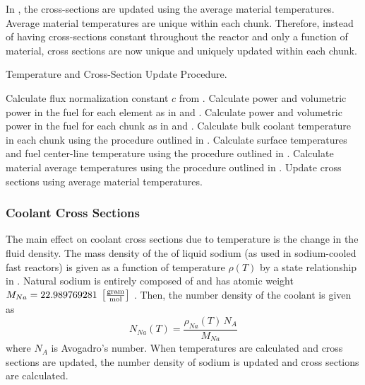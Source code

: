     In , the cross-sections are
    updated using the average material temperatures. Average material
    temperatures are unique within each chunk. Therefore, instead of having
    cross-sections constant throughout the reactor and only a function of
    material, cross sections are now unique and uniquely updated within each
    chunk.

    \begin{algorithm}
      \caption{Temperature and Cross-Section Update Procedure.}
      \label{algorithm:temperature_update}
      \begin{algorithmic}[1]
        \State Calculate flux normalization constant $c$ from
          .
        \State Calculate power and volumetric power in the fuel for each element
          as in  and .
        \State Calculate power and volumetric power in the fuel for each chunk
          as in  and .
        \State Calculate bulk coolant temperature in each chunk using the 
          procedure outlined in .
        \State Calculate surface temperatures and fuel center-line temperature
          using the procedure outlined in .
        \State Calculate material average temperatures using the procedure 
          outlined in .
        \State Update cross sections using average material temperatures.
      \end{algorithmic}
    \end{algorithm}

    \subsubsection{Coolant Cross Sections}
      The main effect on coolant cross sections due to temperature is the change
      in the fluid density. The mass density of the of liquid sodium (as used in
      sodium-cooled fast reactors) is given as a function of temperature
      $\rho(T)$ by a state relationship in \cite{sodiumProp}. Natural sodium is
      entirely composed of  and has atomic weight $M_{Na} =
      22.989769281 \;\left[\text{{$\frac{\text{gram}}{\text{mol}}$}}\right]$ \cite{nuclides}.
      Then, the number density of the coolant is given as
      \begin{equation}
        \label{eq:number_density_sodium}
        N_{Na}(T) = \frac{\rho_{Na}(T) \, N_A}{M_{Na}}
      \end{equation}
      where $N_A$ is Avogadro's number. When temperatures are calculated and
      cross sections are updated, the number density of sodium is updated and
      cross sections are calculated. 
      
